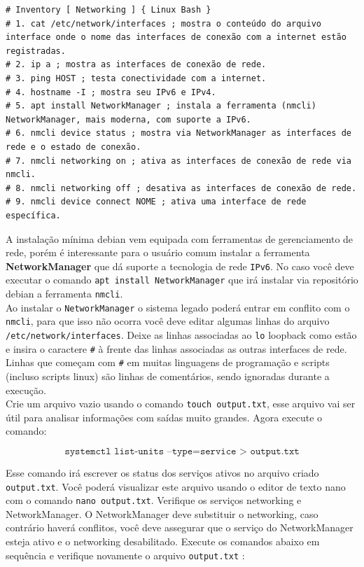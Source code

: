 \documentclass[12pt,a4paper]{article}
\begin{document}
\begin{lstlisting}
# Inventory [ Networking ] { Linux Bash }
# 1. cat /etc/network/interfaces ; mostra o conteúdo do arquivo interface onde o nome das interfaces de conexão com a internet estão registradas. 
# 2. ip a ; mostra as interfaces de conexão de rede.
# 3. ping HOST ; testa conectividade com a internet.
# 4. hostname -I ; mostra seu IPv6 e IPv4.
# 5. apt install NetworkManager ; instala a ferramenta (nmcli) NetworkManager, mais moderna, com suporte a IPv6.
# 6. nmcli device status ; mostra via NetworkManager as interfaces de rede e o estado de conexão.
# 7. nmcli networking on ; ativa as interfaces de conexão de rede via nmcli. 
# 8. nmcli networking off ; desativa as interfaces de conexão de rede. 
# 9. nmcli device connect NOME ; ativa uma interface de rede específica.
\end{lstlisting}

A instalação mínima debian vem equipada com ferramentas de gerenciamento de rede, porém é interessante para o usuário comum instalar a ferramenta \textbf{NetworkManager} que dá suporte a tecnologia de rede \texttt{IPv6}. No caso você deve executar o comando \texttt{apt install NetworkManager} que irá instalar via repositório debian a ferramenta \texttt{nmcli}. \\

Ao instalar o \texttt{NetworkManager} o sistema legado poderá entrar em conflito com o \texttt{nmcli}, para que isso não ocorra você deve editar algumas linhas do arquivo \texttt{/etc/network/interfaces}. Deixe as linhas associadas ao \texttt{lo} loopback como estão e insira o caractere \texttt{\#} à frente das linhas associadas as outras interfaces de rede. Linhas que começam com \texttt{\#} em muitas linguagens de programação e scripts (incluso scripts linux) são linhas de comentários, sendo ignoradas durante a execução. \\

Crie um arquivo vazio usando o comando \texttt{touch output.txt}, esse arquivo vai ser útil para analisar informações com saídas muito grandes. Agora execute o comando:

$$ \texttt{systemctl list-units --type=service > output.txt} $$

Esse comando irá escrever os status dos serviços ativos no arquivo criado \texttt{output.txt}. Você poderá visualizar este arquivo usando o editor de texto nano com o comando \texttt{nano output.txt}. Verifique os serviços networking e NetworkManager. O NetworkManager deve substituir o networking, caso contrário haverá conflitos, você deve assegurar que o serviço do NetworkManager esteja ativo e o networking desabilitado. Execute os comandos abaixo em sequência e verifique novamente o arquivo \texttt{output.txt} :
\end{document}
